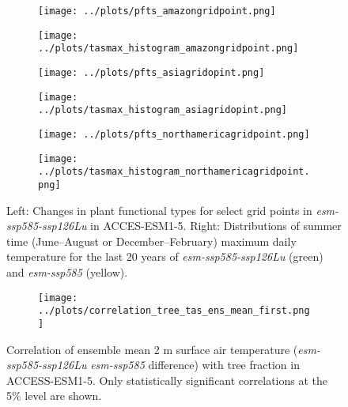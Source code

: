 \documentclass[]{article}
\begin{document}
\begin{figure}[H]
    \centering
    \begin{subfigure}[b]{0.4\linewidth}
        \texttt{[image: ../plots/pfts\_amazongridpoint.png]}
    \end{subfigure}
    \begin{subfigure}[b]{0.4\linewidth}
        \texttt{[image: ../plots/tasmax\_histogram\_amazongridpoint.png]}
    \end{subfigure}
    \begin{subfigure}[b]{0.4\linewidth}
        \texttt{[image: ../plots/pfts\_asiagridopint.png]}
    \end{subfigure}
    \begin{subfigure}[b]{0.4\linewidth}
        \texttt{[image: ../plots/tasmax\_histogram\_asiagridopint.png]}
    \end{subfigure}
    \begin{subfigure}[b]{0.4\linewidth}
        \texttt{[image: ../plots/pfts\_northamericagridpoint.png]}
    \end{subfigure}
    \begin{subfigure}[b]{0.4\linewidth}
        \texttt{[image: ../plots/tasmax\_histogram\_northamericagridpoint.png]}
    \end{subfigure}
    \caption{Left: Changes in plant functional types for select grid points in \textit{esm-ssp585-ssp126Lu} in ACCES-ESM1-5. Right: Distributions of summer time (June--August or December--February) maximum daily temperature for the last 20 years of \textit{esm-ssp585-ssp126Lu} (green) and \textit{esm-ssp585} (yellow).}
    \label{fig:tasmax_distribution}
\end{figure}

\begin{figure}[H]
    \centering
    \begin{subfigure}[b]{0.7\linewidth}
        \texttt{[image: ../plots/correlation\_tree\_tas\_ens\_mean\_first.png]}
    \end{subfigure}
    \caption{Correlation of ensemble mean 2 m surface air temperature (\textit{esm-ssp585-ssp126Lu} \textit{esm-ssp585} difference) with tree fraction in ACCESS-ESM1-5. Only statistically significant correlations at the 5\% level are shown.}
    \label{fig:map_tas_tree_correlation}
\end{figure}
\end{document}
